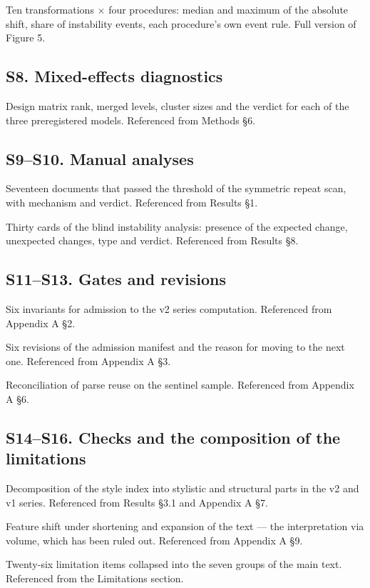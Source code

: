 \documentclass[11pt,a4paper]{article}
\renewcommand{\_}{\textunderscore\allowbreak}
\begin{document}
Ten transformations $\times$ four procedures: median and maximum of the absolute shift,
share of instability events, each procedure's own event rule. Full version of
Figure 5.

\subsection{S8. Mixed-effects diagnostics}



Design matrix rank, merged levels, cluster sizes and the verdict for each of the
three preregistered models. Referenced from Methods §6.

\subsection{S9–S10. Manual analyses}



Seventeen documents that passed the threshold of the symmetric repeat scan, with
mechanism and verdict. Referenced from Results §1.



Thirty cards of the blind instability analysis: presence of the expected change,
unexpected changes, type and verdict. Referenced from Results §8.

\subsection{S11–S13. Gates and revisions}



Six invariants for admission to the v2 series computation. Referenced from
Appendix A §2.



Six revisions of the admission manifest and the reason for moving to the next
one. Referenced from Appendix A §3.



Reconciliation of parse reuse on the sentinel sample. Referenced from
Appendix A §6.

\subsection{S14–S16. Checks and the composition of the limitations}



Decomposition of the style index into stylistic and structural parts in the v2
and v1 series. Referenced from Results §3.1 and Appendix A §7.



Feature shift under shortening and expansion of the text — the interpretation
via volume, which has been ruled out. Referenced from Appendix A §9.



Twenty-six limitation items collapsed into the seven groups of the main text.
Referenced from the Limitations section.
\end{document}

